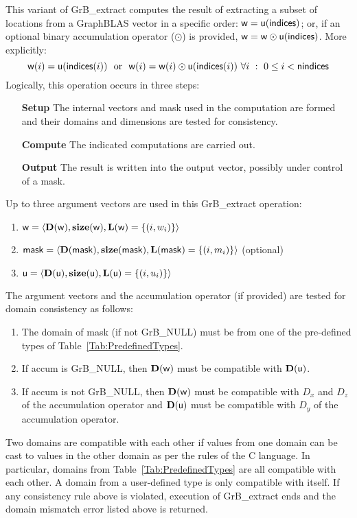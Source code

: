 This variant of {\sf GrB\_extract} computes the result of extracting a subset of
locations from a GraphBLAS vector in a specific order: 
${\sf w} = {\sf u}({\sf indices})$; or, if an optional binary accumulation 
operator ($\odot$) is provided, ${\sf w} = {\sf w} \odot {\sf u}({\sf indices})$.  
More explicitly:
\[
    {\sf w}(i) = {\sf u}({\sf indices}(i)) \mbox{~~or~~} 
    {\sf w}(i) = {\sf w}(i) \odot {\sf u}({\sf indices}(i))
    \ \forall i \ : \ 0 \leq i < {\sf nindices}
\]  
Logically, this operation occurs in three steps:
\begin{enumerate}[leftmargin=0.75in]
\item[\bf Setup] The internal vectors and mask used in the computation are formed 
and their domains and dimensions are tested for consistency.
\item[\bf Compute] The indicated computations are carried out.
\item[\bf Output] The result is written into the output vector, possibly under 
control of a mask.
\end{enumerate}

Up to three argument vectors are used in this {\sf GrB\_extract} operation:
\begin{enumerate}
	\item ${\sf w} = \langle \bold{D}({\sf w}),\bold{size}({\sf w}),
    \bold{L}({\sf w}) = \{(i,w_i) \} \rangle$

	\item ${\sf mask} = \langle \bold{D}({\sf mask}),\bold{size}({\sf mask}),
    \bold{L}({\sf mask}) = \{(i,m_i) \} \rangle$ (optional)

	\item ${\sf u} = \langle \bold{D}({\sf u}),\bold{size}({\sf u}),
    \bold{L}({\sf u}) = \{(i,u_i) \} \rangle$
\end{enumerate}

The argument vectors and the accumulation 
operator (if provided) are tested for domain consistency as follows:
\begin{enumerate}
	\item The domain of {\sf mask} (if not {\sf GrB\_NULL}) must be from one of 
    the pre-defined types of Table~\ref{Tab:PredefinedTypes}.

	\item If {\sf accum} is {\sf GrB\_NULL}, then $\bold{D}({\sf w})$ must be 
    compatible with $\bold{D}({\sf u})$.

	\item If {\sf accum} is not {\sf GrB\_NULL}, then $\bold{D}({\sf w})$ must be
    compatible with $D_x$ and $D_z$ of the accumulation operator and 
    $\bold{D}({\sf u})$ must be compatible with $D_y$ of the accumulation operator.
\end{enumerate}
Two domains are compatible with each other if values from one domain can be cast 
to values in the other domain as per the rules of the C language.
In particular, domains from Table~\ref{Tab:PredefinedTypes} are all compatible 
with each other. A domain from a user-defined type is only compatible with itself.
If any consistency rule above is violated, execution of {\sf GrB\_extract} ends
and the domain mismatch error listed above is returned.

